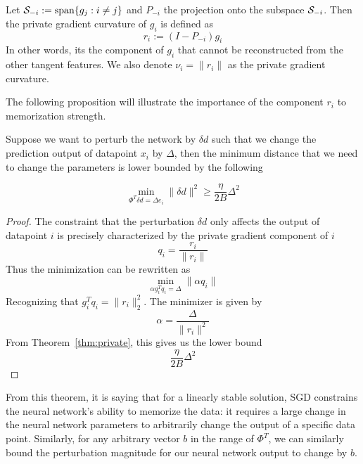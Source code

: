 \begin{definition}
Let $\mathcal{S}_{-i} : = \text{span}\{g_j: i\neq j\}$ and $P_{-i}$ the projection onto the subspace $\mathcal{S}_{-i}$. Then the private gradient curvature of $g_i$ is defined as 
\begin{equation}
    r_i := (I-P_{-i})g_i
\end{equation}
In other words, its the component of $g_i$ that cannot be reconstructed from the other tangent features. 
We also denote $\nu_i = \|r_i\|$ as the private gradient curvature. 
\end{definition}

The following proposition will illustrate the importance of the component $r_i$ to memorization strength.



\begin{theorem}
Suppose we want to perturb the network by $\delta d$ such that we change the prediction output of datapoint $x_i$ by $\Delta$, then the minimum distance that we need to change the parameters is lower bounded by the following

\[\min_{\Phi^T\delta d = \Delta e_i} \|\delta d\|^2 \geq \frac{\eta}{2B}\Delta^2\]
\end{theorem}
\begin{proof}
    The constraint that the perturbation $\delta d$ only affects the output of datapoint $i$ is precisely characterized by the private gradient component of $i$
    \[q_i = \frac{r_i}{\|r_i\|}\]
    Thus the minimization can be rewritten as
    \begin{equation}
        \min_{\alpha g_i^Tq_i = \Delta} \|\alpha q_i\|
    \end{equation}
    Recognizing that $g_i^Tq_i = \|r_i\|_2^2$. The minimizer is given by 
    \[\alpha = \frac{\Delta}{\|r_i\|^2} \]
    From Theorem~\ref{thm:private}, this gives us the lower bound 
    \[ \frac{\eta}{2B}\Delta^2\]
\end{proof}
From this theorem, it is saying that for a linearly stable solution, SGD constrains the neural network's ability to memorize the data: it requires a large change in the neural network parameters to arbitrarily change the output of a specific data point. 
Similarly, for any arbitrary vector $b$ in the range of $\Phi^T$, we can similarly bound the perturbation magnitude for our neural network output to change by $b$. 

